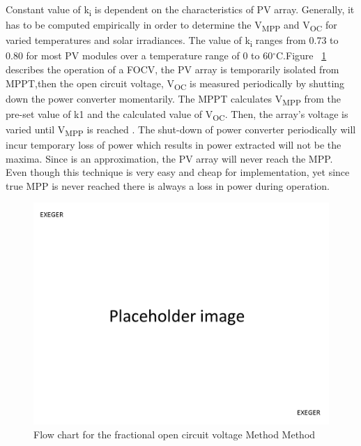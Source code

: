   Constant value of k\textsubscript{i} is dependent on the characteristics of PV array. Generally, it has to be computed empirically in order to determine the V\textsubscript{MPP} and V\textsubscript{OC} for varied temperatures and solar irradiances. The value of k\textsubscript{i} ranges from 0.73 to 0.80  for most PV modules over a temperature range of 0 to 60$^\circ$C.Figure ~\ref{fig:focflow} describes the operation of a \ac{FOCV}, the PV array is temporarily isolated from \ac{MPPT},then the open circuit voltage, V\textsubscript{OC} is measured periodically by shutting down the power converter momentarily. The \ac{MPPT} calculates V\textsubscript{MPP} from the pre-set value of k1 and the calculated value of V\textsubscript{OC}. Then, the array's voltage is varied until V\textsubscript{MPP} is  reached . The shut-down of power converter periodically will incur temporary loss of power which results in power extracted will not be the maxima. Since is an approximation, the PV array will never reach the \ac{MPP}. Even though this technique is very easy and cheap for implementation, yet since true \ac{MPP} is never reached there is always a loss in power during operation\cite{ngan2011study}.
  
  \begin{figure}[H]
        \begin{center}
        \includegraphics[width=\textwidth]{images/pacehold}
        \caption{ Flow chart for the fractional open circuit voltage Method  Method }
        \label{fig:focflow}
        \end{center}
        \end{figure}
  
